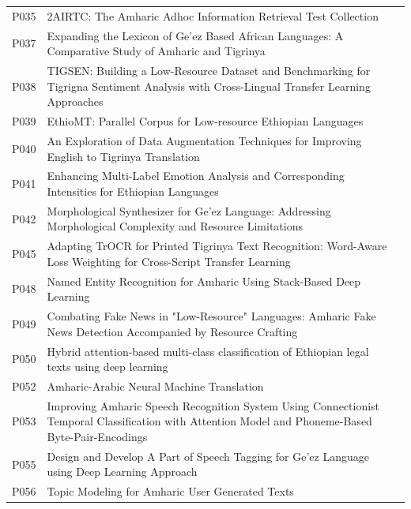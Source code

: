 \documentclass[sn-mathphys-num]{sn-jnl}
\theoremstyle{thmstyleone}
\theoremstyle{thmstyletwo}
\theoremstyle{thmstylethree}
\begin{document}
\begin{appendices}
\begin{longtable}{@{}p{1.1cm}p{8.5cm}p{2.3cm}@{}}
P035 & 2AIRTC: The Amharic Adhoc Information Retrieval Test Collection & \citep{yeshambel_2airtc_2020} \\
P037 & Expanding the Lexicon of Ge'ez Based African Languages: A Comparative Study of Amharic and Tigrinya & \citep{teklehaymanot_expanding_2026} \\
P038 & TIGSEN: Building a Low-Resource Dataset and Benchmarking for Tigrigna Sentiment Analysis with Cross-Lingual Transfer Learning Approaches & \citep{gebremeskel_tigsen_2026} \\
P039 & EthioMT: Parallel Corpus for Low-resource Ethiopian Languages & \citep{tonja_ethiomt_2024} \\
P040 & An Exploration of Data Augmentation Techniques for Improving English to Tigrinya Translation & \citep{kidane_exploration_2021} \\
P041 & Enhancing Multi-Label Emotion Analysis and Corresponding Intensities for Ethiopian Languages & \citep{belay_enhancing_2026} \\
P042 & Morphological Synthesizer for Ge'ez Language: Addressing Morphological Complexity and Resource Limitations & \citep{gidey_morphological_2024} \\
P045 & Adapting TrOCR for Printed Tigrinya Text Recognition: Word-Aware Loss Weighting for Cross-Script Transfer Learning & \citep{medhanie_adapting_2026} \\
P048 & Named Entity Recognition for Amharic Using Stack-Based Deep Learning & \citep{sikdar_named_2018} \\
P049 & Combating Fake News in "Low-Resource" Languages: Amharic Fake News Detection Accompanied by Resource Crafting & \citep{gereme_combating_2021} \\
P050 & Hybrid attention-based multi-class classification of Ethiopian legal texts using deep learning & \citep{alemu_hybrid_2026} \\
P052 & Amharic-Arabic Neural Machine Translation & \citep{gashaw_amharicarabic_2019} \\
P053 & Improving Amharic Speech Recognition System Using Connectionist Temporal Classification with Attention Model and Phoneme-Based Byte-Pair-Encodings & \citep{emiru_improving_2021} \\
P055 & Design and Develop A Part of Speech Tagging for Ge'ez Language using Deep Learning Approach & \citep{kassahun_partofspeech_2022} \\
P056 & Topic Modeling for Amharic User Generated Texts & \citep{neshir_topicmodeling_2021} \\

\end{longtable}
\end{appendices}
\end{document}
